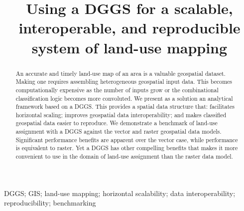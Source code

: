 \documentclass[]{interact}
\theoremstyle{plain}%
\theoremstyle{definition}
\theoremstyle{remark}
\begin{document}

\title{Using a \acl{DGGS} for a scalable, interoperable, and reproducible system of land-use mapping}

\author{
    }

\maketitle

\begin{abstract}
An accurate and timely land-use map of an area is a valuable geospatial dataset. Making one requires assembling heterogeneous geospatial input data. This becomes computationally expensive as the number of inputs grow or the combinational classification logic becomes more convoluted. We present as a solution an analytical framework based on a \ac{DGGS}. This provides a spatial data structure that: facilitates horizontal scaling; improves geospatial data interoperability; and makes classified geospatial data easier to reproduce. We demonstrate a benchmark of land-use assignment with a \ac{DGGS} against the vector and raster geospatial data models. Significant performance benefits are apparent over the vector case, while performance is equivalent to raster. Yet a \ac{DGGS} has other compelling benefits that makes it more convenient to use in the domain of land-use assignment than the raster data model.
\end{abstract}



\begin{keywords}
\Acl{DGGS}; \acl{GIS}; land-use mapping; horizontal scalability; data interoperability; reproducibility; benchmarking
\end{keywords}
\end{document}
